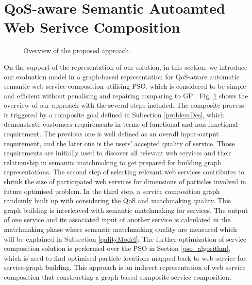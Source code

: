 \documentclass{llncs}
\begin{document}
\section{QoS-aware Semantic Autoamted Web Serivce Composition}\label{qswsc_approach}
\begin{figure}[h]
\centerline{
}
 \caption{Overview of the proposed approach.}
 \label{overview}
\end{figure}
On the support of the representation of our solution, in this section, we introduce our evaluation model in a graph-based representation for QoS-aware automatic semantic web service composition utilising PSO, which is considered to be simple and efficient without penalising and repairing comparing to GP \cite{da2014graph}. Fig. \ref{overview} shows the overview of our approach with the several steps included. The composite process is triggered by a composite goal defined in Subection \ref{problemDes}, which demonstrate customers requirements in terms of functional and non-functional requirement. The previous one is well defined as an overall input-output requirement, and the later one is the users' accepted quality of service. Those requirements are initially used to discover all relevant web services and their relationship in semantic matchmaking to get prepared for building graph representations. The second step of selecting relevant web services contributes to shrink the size of participated web services for dimensions of particles involved in future optimised problem. In the third step, a service composition graph randomly built up with considering the QoS and matchmaking quality. This graph building is interleaved with semantic matchmaking for services. The output of one service and its associated input of another service is calculated in the matchmaking phase where semantic matchmaking quality are measured which will be explained in Subsection \ref{qulityModel}. The further optimization of service composition solution is performed over the PSO in Section \ref{pso_algorithm}, which is used to find optimised particle locations mapped back to web service for service-graph building. This approach \cite{da2016particle} is an indirect representation of web service composition that constructing a graph-based composite service composition.
\end{document}
